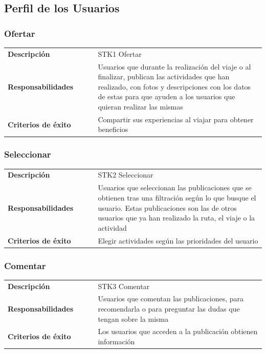 \documentclass[11pt]{article}
\begin{document}
\subsection{Perfil de los Usuarios}
\subsubsection{Ofertar}
\begin{table}[H]
  \centering
  \begin{tabular}{p{0.35\linewidth}|p{0.65\linewidth}}
    \toprule
    \textbf{Descripción} & STK1 Ofertar\\
    \textbf{Responsabilidades} & Usuarios que durante la realización del viaje o al finalizar, publican las actividades que han realizado, con fotos y descripciones con los datos de estas para que ayuden a los usuarios que quieran realizar las mismas\\
    \textbf{Criterios de éxito} &  Compartir sus experiencias al viajar para obtener beneficios\\
    \bottomrule
  \end{tabular}
\end{table}

\subsubsection{Seleccionar}
\begin{table}[H]
  \centering
  \begin{tabular}{p{0.35\linewidth}|p{0.65\linewidth}}
    \toprule
    \textbf{Descripción} & STK2 Seleccionar\\
    \textbf{Responsabilidades} & Usuarios que seleccionan las publicaciones que se obtienen tras una filtración según lo que busque el usuario. Estas publicaciones son las de otros usuarios que ya han realizado la ruta, el viaje o la actividad\\
    \textbf{Criterios de éxito} &  Elegir actividades según las prioridades del usuario\\
    \bottomrule
  \end{tabular}
\end{table}

\subsubsection{Comentar}
\begin{table}[H]
  \centering
  \begin{tabular}{p{0.35\linewidth}|p{0.65\linewidth}}
    \toprule
    \textbf{Descripción} & STK3 Comentar\\
    \textbf{Responsabilidades} & Usuarios que comentan las publicaciones, para recomendarla o para preguntar las dudas que tengan sobre la misma\\
    \textbf{Criterios de éxito} &  Los usuarios que acceden a la publicación obtienen información\\
    \bottomrule
  \end{tabular}
\end{table}
\end{document}
